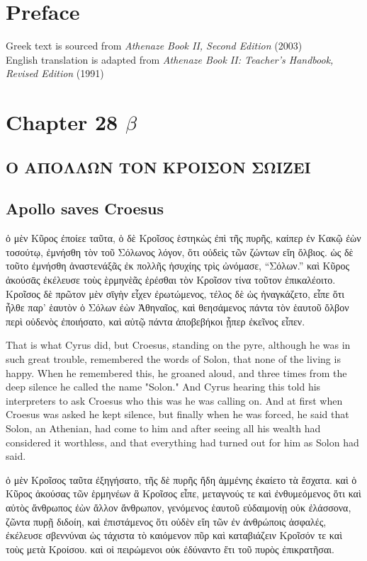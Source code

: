 \documentclass{article}
\begin{document}
\section{Preface}

Greek text is sourced from \emph{Athenaze Book II, Second Edition} (2003) \\
English translation is adapted from \emph{Athenaze Book II: Teacher's Handbook, Revised Edition} (1991)

\section{Chapter 28 $\beta$}

\subsection*{\textgreek{Ο ΑΠΟΛΛΩΝ ΤΟΝ ΚΡΟΙΣΟΝ ΣΩΙΖΕΙ}}
\subsection*{Apollo saves Croesus}

\begin{greek}
ὁ μὲν Κῦρος ἐποίεε ταῦτα, ὁ δὲ Κροῖσος ἑστηκὼς ἐπὶ τῆς πυρῆς,
καίπερ ἐν Κακῷ ἐὼν τοσούτῳ, ἐμνήσθη τὸν τοῦ Σόλωνος λόγον,
ὅτι οὐδεὶς τῶν ζώντων εἴη ὄλβιος.
ὡς δὲ τοῦτο ἐμνήσθη ἀναστενάξᾶς ἐκ πολλῆς ἡσυχίης τρὶς ὠνόμασε, “Σόλων.”
καὶ Κῦρος ἀκούσᾱς ἐκέλευσε τοὺς ὲρμηνὲᾶς ἐρέσθαι τὸν Κροῖσον τίνα τοῦτον ἐπικαλέοιτο.
Κροῖσος δὲ πρῶτον μὲν σῑγὴν εἶχεν ἐρωτώμενος, τέλος δὲ ὡς ἠναγκάζετο,
εἶπε ὅτι ἦλθε παρ’ ἑαυτὸν ὁ Σόλων ἐὼν Ἀθηναῖος,
καὶ θεησάμενος πάντα τὸν ἑαυτοῦ ὄλβον περὶ οὐδενὸς ἐποιήσατο,
καὶ αὐτῷ πάντα ἀποβεβήκοι ᾗπερ ἐκεῖνος εἶπεν. \\
\end{greek}


That is what Cyrus did, but Croesus, standing on the pyre,
although he was in such great trouble, remembered the words of Solon,
that none of the living is happy.
When he remembered this, he groaned aloud,
and three times from the deep silence he called the name "Solon."
And Cyrus hearing this told his interpreters to ask Croesus who this was he was calling on.
And at first when Croesus was asked he kept silence,
but finally when he was forced, he said that Solon, an Athenian, had come to him
and after seeing all his wealth had considered it worthless,
and that everything had turned out for him as Solon had said. \\


\begin{greek}
ὁ μὲν Κροῖσος ταῦτα ἐξηγήσατο, τῆς δὲ πυρῆς ἤδη ἁμμένης ἐκαίετο τὰ ἔσχατα.
καὶ ὁ Κῦρος ἀκούσας τῶν ἑρμηνέων ἃ Κροῖσος εἶπε,
μεταγνούς τε καὶ ἐνθυμεόμενος ὅτι καὶ αὐτὸς ἄνθρωπος ἐὼν ἄλλον ἄνθρωπον,
γενόμενος ἑαυτοῦ εὐδαιμονίῃ οὐκ ἐλάσσονα, ζῶντα πυρῇ διδοίη,
καὶ ἐπιστάμενος ὅτι οὐδὲν εἴη τῶν ἐν ἀνθρώποις ἀσφαλές,
ἐκέλευσε σβεννύναι ὡς τάχιστα τὸ καιόμενον πῦρ
καὶ καταβιάζειν Κροῖσόν τε καὶ τοὺς μετὰ Κροίσου.
καὶ οἱ πειρώμενοι οὐκ ἐδύναντο ἔτι τοῦ πυρὸς ἐπικρατῆσαι. \\
\end{greek}
\end{document}
